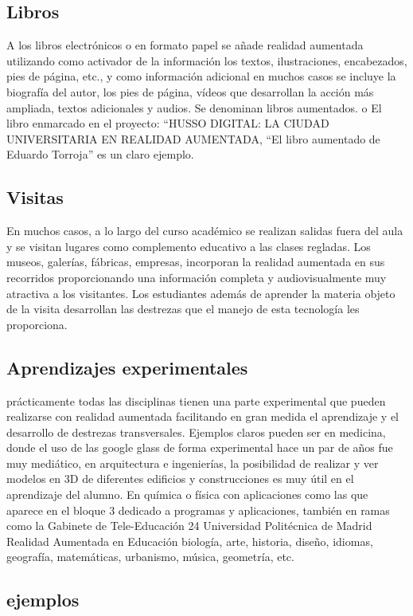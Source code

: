\subsection{Libros}
A los libros electrónicos o en formato papel se añade realidad aumentada utilizando como activador de la información los textos, ilustraciones, encabezados, pies de página, etc., y como información adicional en muchos casos se incluye la biografía del autor, los pies de página, vídeos que desarrollan la acción más ampliada, textos adicionales y audios. Se denominan libros aumentados.
o El libro enmarcado en el proyecto: “HUSSO DIGITAL: LA CIUDAD UNIVERSITARIA EN REALIDAD AUMENTADA, “El libro aumentado de Eduardo Torroja” es un claro ejemplo.

\subsection{Visitas}
En muchos casos, a lo largo del curso académico se realizan salidas fuera del aula y se visitan lugares como complemento educativo a las clases regladas. Los museos, galerías, fábricas, empresas, incorporan la realidad aumentada en sus recorridos proporcionando una información completa y audiovisualmente muy atractiva a los visitantes. Los estudiantes además de aprender la materia objeto de la visita desarrollan las destrezas que el manejo de esta tecnología les proporciona.

\subsection{Aprendizajes experimentales} 
prácticamente todas las disciplinas tienen una parte experimental que pueden realizarse con realidad aumentada facilitando en gran medida el aprendizaje y el desarrollo de destrezas transversales. Ejemplos claros pueden ser en medicina, donde el uso de las google glass de forma experimental hace un par de años fue muy mediático, en arquitectura e ingenierías, la posibilidad de realizar y ver modelos en 3D de diferentes edificios y construcciones es muy útil en el aprendizaje del alumno. En química o física con aplicaciones como las que aparece en el bloque 3 dedicado a programas y aplicaciones, también en ramas como la Gabinete de Tele-Educación 24 Universidad Politécnica de Madrid Realidad Aumentada en Educación biología, arte, historia, diseño, idiomas, geografía, matemáticas, urbanismo, música, geometría, etc.


\subsection{ejemplos}

